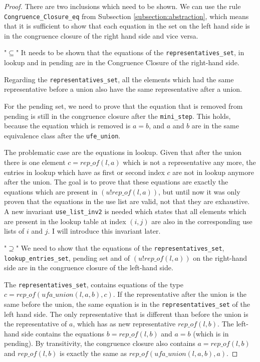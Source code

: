 \begin{proof}
There are two inclusions which need to be shown. We can use the rule \lstinline{Congruence_Closure_eq} from Subsection \ref{subsection:abstraction}, which means that it is sufficient to show that each equation in the set on the left hand side is in the congruence closure of the right hand side and vice versa.

"$\subseteq$" It needs to be shown that the equations of the \lstinline{representatives_set}, in lookup and in pending are in the Congruence Closure of the right-hand side.

Regarding the \lstinline{representatives_set}, all the elements which had the same representative before a union also have the same representative after a union.

For the pending set, we need to prove that the equation that is removed from pending is still in the congruence closure after the \lstinline{mini_step}. This holds, because the equation which is removed is $a = b$, and $a$ and $b$ are in the same equivalence class after the \lstinline{ufe_union}.

The problematic case are the equations in lookup. Given that after the union there is one element $c = rep\_of(l, a)$ which is not a representative any more, the entries in lookup which have as first or second index $c$ are not in lookup anymore after the union. The goal is to prove that these equations are exactly the equations which are present in $(u ! rep\_of(l, a))$, but until now it was only proven that the equations in the use list are valid, not that they are exhaustive. A new invariant \lstinline{use_list_inv2} is needed which states that all elements which are present in the lookup table at index $(i, j)$ are also in the corresponding use lists of $i$ and $j$. I will introduce this invariant later.

"$\supseteq$" We need to show that the equations of the \lstinline{representatives_set}, \lstinline{lookup_entries_set}, pending set and of $(u ! rep\_of(l, a))$ on the right-hand side are in the congruence closure of the left-hand side.

The \lstinline{representatives_set}, contains equations of the type $c = rep\_of (ufa\_union(l, a, b), c)$. If the representative after the union is the same before the union, the same equation is in the \lstinline{representatives_set} of the left hand side. The only representative that is different than before the union is the representative of $a$, which has as new representative $rep\_of(l, b)$. The left-hand side contains the equations $b = rep\_of(l, b)$ and $a = b$ (which is in pending). By transitivity, the congruence closure also contains $a = rep\_of(l, b)$ and $rep\_of(l, b)$ is exactly the same as $rep\_of (ufa\_union(l, a, b), a)$.


\end{proof}
